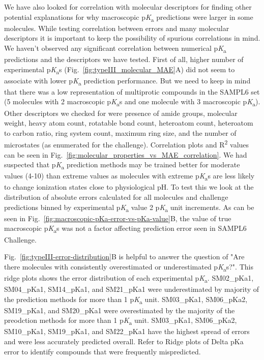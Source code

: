 \documentclass[9pt,lineno,final]{elife}
\newcommand{\pKa}{p\textit{K}\textsubscript{a}}
\begin{document}
We have also looked for correlation with molecular descriptors for finding other potential explanations for why macroscopic \pKa{} predictions were larger in some molecules. 
While testing correlation between errors and many molecular descriptors it is important to keep the possibility of spurious correlations in mind. 
We haven't observed any significant correlation between numerical \pKa{} predictions and the descriptors we have tested. 
First of all, higher number of experimental \pKa{}s (Fig.~\ref{fig:typeIII_molecular_MAE}A) did not seem to associate with lower \pKa{} prediction performance. 
But we need to keep in mind that there was a low representation of multiprotic compounds in the SAMPL6 set (5 molecules with 2 macroscopic \pKa{}s and one molecule with 3 macroscopic \pKa{}).
Other descriptors we checked for were presence of amide groups, molecular weight, heavy atom count, rotatable bond count, heteroatom count, heteroatom to carbon ratio, ring system count, maximum ring size, and the number of microstates (as enumerated for the challenge). 
Correlation plots and R\textsuperscript{2} values can be seen in Fig.~\ref{fig:molecular_properties_vs_MAE_correlation}. 
We had suspected that \pKa{} prediction methods may be trained better for moderate values (4-10) than extreme values as molecules with extreme \pKa{}s are less likely to change ionization states close to physiological pH. To test this we look at the distribution of absolute errors calculated for all molecules and challenge predictions binned by experimental \pKa{} value 2 \pKa{} unit increments. 
As can be seen in Fig.~\ref{fig:macroscopic-pKa-error-vs-pKa-value}B, the value of true macroscopic \pKa{}s was not a factor affecting prediction error seen in SAMPL6 Challenge.


Fig.~\ref{fig:typeIII-error-distribution}B is helpful to answer the question of "Are there molecules with consistently overestimated or underestimated \pKa{}s?". This ridge plots shows the error distribution of each experimental \pKa{}. SM02\_pKa1, SM04\_pKa1, SM14\_pKa1, and SM21\_pKa1 were underestimated by majority of the prediction methods for more than 1 \pKa{} unit. 
SM03\_pKa1, SM06\_pKa2, SM19\_pKa1, and SM20\_pKa1 were overestimated by the majority of the preodction methods for more than 1 \pKa{} unit.
SM03\_pKa1, SM06\_pKa2, SM10\_pKa1, SM19\_pKa1, and SM22\_pKa1 have the highest spread of errors and were less accurately predicted overall. Refer to Ridge plots of Delta pKa error to identify compounds that were frequently mispredicted.
\end{document}
